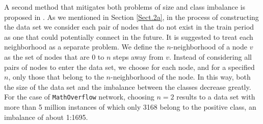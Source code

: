 \documentclass{acm_proc_article-sp}
\begin{document}

A second method that mitigates both problems of size and class imbalance is proposed in \cite{Lichtenwalter:2010:NPM:1835804.1835837}. As we mentioned in Section \ref{Sect.2a}, in the process of constructing the data set we consider each pair of nodes that do not exist in the train period as one that could potentially connect in the future. It is suggested to treat each neighborhood as a separate problem. We define the $n$-neighborhood of a node $v$ as the set of nodes that are 0 to $n$ steps away from $v$. Instead of considering all pairs of nodes to enter the data set, we choose for each node, and for a specified $n$, only those that belong to the $n$-neighborhood of the node. In this way, both the size of the data set and the imbalance between the classes decrease greatly. For the case of \texttt{MathOverflow} network, choosing $n=2$ results to a data set with more than 5 million instances of which only 3168 belong to the positive class, an imbalance of about 1:1695.





\end{document}
